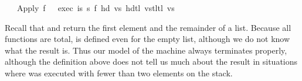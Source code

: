 \begin{isabellebody}
\ \ {}\ Apply\ f\ \ {}\ exec\ is\ s\ {}{}f\ {}hd\ vs{}\ {}hd{}tl\ vs{}{}{}{}{}tl{}tl\ vs{}{}{}{}{}%
\begin{isamarkuptext}%
\noindent
Recall that  and 
return the first element and the remainder of a list.
Because all functions are total,  is defined even for the empty
list, although we do not know what the result is. Thus our model of the
machine always terminates properly, although the definition above does not
tell us much about the result in situations where  was executed
with fewer than two elements on the stack.


\end{isamarkuptext}
\end{isabellebody}
